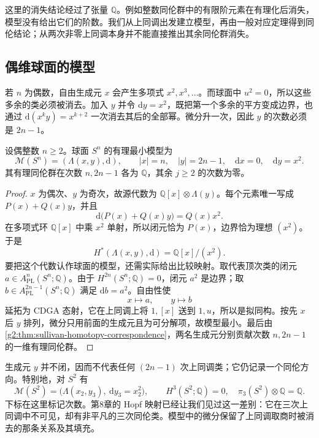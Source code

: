 这里的消失结论经过了张量 \(\mathbb Q\)。例如整数同伦群中的有限阶元素在有理化后消失，模型没有给出它们的阶数。我们从上同调出发建立模型，再由一般对应定理得到同伦结论；从两次非零上同调本身并不能直接推出其余同伦群消失。

\subsection{偶维球面的模型}
\label{g2:subsec:E03:02}

若 \(n\) 为偶数，自由生成元 \(x\) 会产生多项式 \(x^2,x^3,\ldots\)。而球面中 \(u^2=0\)，所以这些多余的类必须被消去。加入 \(y\) 并令 \(\mathrm dy=x^2\)，既把第一个多余的平方变成边界，也通过 \(\mathrm d(x^ky)=x^{k+2}\) 一次消去其后的全部幂。微分升一次，因此 \(y\) 的次数必须是 \(2n-1\)。

\begin{proposition}\label{g2:prop:even-sphere-minimal-model}
	设偶整数 \(n\geq2\)。球面 \(S^n\) 的有理最小模型为
	\[
		\mathcal M(S^n)=(\Lambda(x,y),\mathrm d),\qquad
		|x|=n,\quad |y|=2n-1,\quad \mathrm dx=0,\quad \mathrm dy=x^2.
	\]
	其有理同伦群在次数 \(n,2n-1\) 各为 \(\mathbb Q\)，其余 \(j\geq2\) 的次数为零。
\end{proposition}
\begin{proof}
	\(x\) 为偶次、\(y\) 为奇次，故源代数为 \(\mathbb Q[x]\otimes\Lambda(y)\)。每个元素唯一写成 \(P(x)+Q(x)y\)，并且
	\[
		\mathrm d\bigl(P(x)+Q(x)y\bigr)=Q(x)x^2.
	\]
	在多项式环 \(\mathbb Q[x]\) 中乘 \(x^2\) 单射，所以闭元恰为 \(P(x)\)，边界恰为理想 \((x^2)\)。于是
	\[
		H^*(\Lambda(x,y),\mathrm d)=\mathbb Q[x]/(x^2).
	\]
	要把这个代数认作球面的模型，还需实际给出比较映射。取代表顶次类的闭元 \(a\in A_{\mathrm{PL}}^n(S^n;\mathbb Q)\)。由于 \(H^{2n}(S^n;\mathbb Q)=0\)，闭元 \(a^2\) 是边界；取 \(b\in A_{\mathrm{PL}}^{2n-1}(S^n;\mathbb Q)\) 满足 \(\mathrm db=a^2\)。自由性使
	\[
		x\longmapsto a,\qquad y\longmapsto b
	\]
	延拓为 CDGA 态射，它在上同调上将 \(1,[x]\) 送到 \(1,u\)，所以是拟同构。按先 \(x\) 后 \(y\) 排列，微分只用前面的生成元且为可分解项，故模型最小。最后由\cref{g2:thm:sullivan-homotopy-correspondence}，两名生成元分别贡献次数 \(n,2n-1\) 的一维有理同伦群。
\end{proof}

生成元 \(y\) 并不闭，因而不代表任何 \((2n-1)\) 次上同调类；它仍记录一个同伦方向。特别地，对 \(S^2\) 有
\[
	\mathcal M(S^2)=\bigl(\Lambda(x_2,y_3),\ \mathrm dy_3=x_2^2\bigr),
	\qquad H^3(S^2;\mathbb Q)=0,\quad \pi_3(S^2)\otimes\mathbb Q=\mathbb Q.
\]
下标在这里标记次数。第8章的 Hopf 映射已经让我们见过这一差别：它在三次上同调中不可见，却有非平凡的三次同伦类。模型中的微分保留了上同调取商时被消去的那条关系及其填充。

